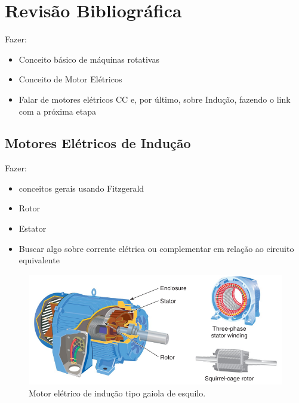 
\chapter{Revisão Bibliográfica}

Fazer:
\begin{itemize}
    \item Conceito básico de máquinas rotativas
    \item Conceito de Motor Elétricos
    \item Falar de motores elétricos CC e, por último, sobre Indução, fazendo o link com a próxima etapa
\end{itemize}

% 

\section{Motores Elétricos de Indução}\label{sec:}

Fazer:
\begin{itemize}
    \item conceitos gerais usando Fitzgerald
    \item Rotor
    \item Estator
    \item Buscar algo sobre corrente elétrica ou complementar em relação ao circuito equivalente
\end{itemize}

\begin{figure}[H]
    \caption{Motor elétrico de indução tipo gaiola de esquilo.}
    \begin{center}
        \includegraphics[scale=.5]{referencial/img/ind_motor_petruzella_p115.png}
    \end{center}
    \label{fig:}
\end{figure}




